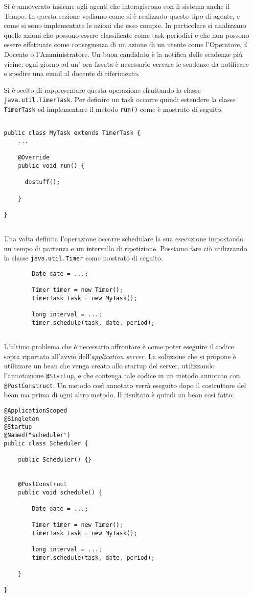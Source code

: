 Si è annoverato insieme agli agenti che interagiscono con il sistema anche il Tempo. In questa sezione vediamo come si è realizzato questo tipo di agente, e come si sono implementate le azioni che esso compie.
In particolare si analizzano quelle azioni che possono essere classificate come task periodici e che non possono essere effettuate come conseguenza di un azione di un utente come l'Operatore, il Docente o l'Amministratore.
Un buon candidato è la notifica delle scadenze più vicine: ogni giorno ad un' ora fissata è necessario cercare le scadenze da notificare e spedire una email al docente di riferimento.

Si è scelto di rappresentare questa operazione sfruttando la classe \texttt{java.util.TimerTask}. Per definire un task occorre quindi estendere la classe \texttt{TimerTask} ed implementare il metodo \texttt{run()} come è mostrato di seguito.
\begin{lstlisting}
 
public class MyTask extends TimerTask {
	...

	@Override
	public void run() {
	
	  dostuff();

	}

}
 
\end{lstlisting}

Una volta definita l'operazione occorre schedulare la sua esecuzione impostando un tempo di partenza e un intervallo di ripetizione. Possiamo fare ciò utilizzando la classe \texttt{java.util.Timer} come mostrato di seguito.

\begin{lstlisting}
		Date date = ...;

		Timer timer = new Timer();
		TimerTask task = new MyTask();

		long interval = ...;
		timer.schedule(task, date, period);
 
\end{lstlisting}

L'ultimo problema che è necessario affrontare è come poter eseguire il codice sopra riportato all'avvio dell'\textit{application server}. La soluzione che si propone è utilizzare un bean che venga creato allo startup del server, utilizzando l'annotazione
 \texttt{@Startup}, e che contenga tale
codice in un metodo annotato con \texttt{@PostConstruct}. Un metodo così annotato verrà eseguito dopo il costruttore del bean ma prima di ogni altro metodo. Il risultato è quindi un bean così fatto:

\begin{lstlisting}
@ApplicationScoped
@Singleton
@Startup
@Named("scheduler")
public class Scheduler {

	public Scheduler() {}


	@PostConstruct
	public void schedule() {

		Date date = ...;

		Timer timer = new Timer();
		TimerTask task = new MyTask();

		long interval = ...;
		timer.schedule(task, date, period);

	}

}
\end{lstlisting}
